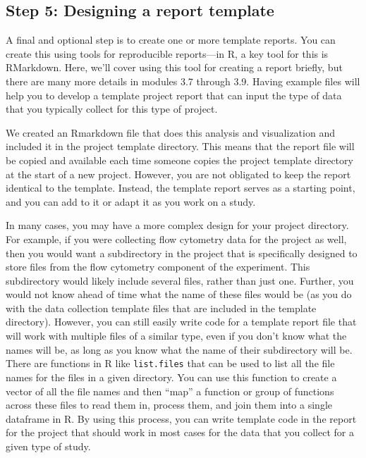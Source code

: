 \documentclass[]{tufte-book}
\begin{document}
\subsection{Step 5: Designing a report template}\label{step-5-designing-a-report-template}

A final and optional step is to create one or more template reports. You can
create this using tools for reproducible reports---in R, a key tool for this is
RMarkdown. Here, we'll cover using this tool for creating a report briefly, but
there are many more details in modules 3.7 through 3.9. Having example files
will help you to develop a template project report that can input the type of
data that you typically collect for this type of project.

We created an Rmarkdown file that does this analysis and visualization and
included it in the project template directory. This means that the report file
will be copied and available each time someone copies the project template
directory at the start of a new project. However, you are not obligated to keep
the report identical to the template. Instead, the template report serves as a
starting point, and you can add to it or adapt it as you work on a study.

In many cases, you may have a more complex design for your project directory. For
example, if you were collecting flow cytometry data for the project as well, then
you would want a subdirectory in the project that is specifically designed to
store files from the flow cytometry component of the experiment. This subdirectory
would likely include several files, rather than just one. Further, you would not
know ahead of time what the name of these files would be (as you do with the data
collection template files that are included in the template directory). However,
you can still easily write code for a template report file that will work with
multiple files of a similar type, even if you don't know what the names will be,
as long as you know what the name of their subdirectory will be. There are functions
in R like \texttt{list.files} that can be used to list all the file names for the files
in a given directory. You can use this function to create a vector of all the file
names and then ``map'' a function or group of functions across these
files to read them in, process them, and join them into a single dataframe in R.
By using this process, you can write template code in the report for the project
that should work in most cases for the data that you collect for a given type of
study.
\end{document}
